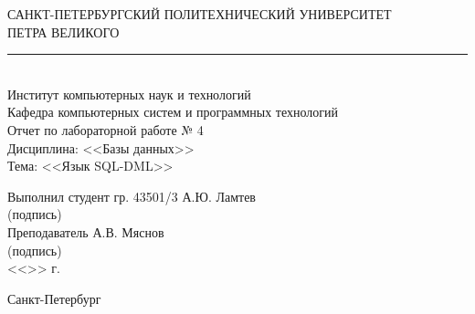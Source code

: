 \begin{titlepage}
\begin{center}
	САНКТ-ПЕТЕРБУРГСКИЙ ПОЛИТЕХНИЧЕСКИЙ УНИВЕРСИТЕТ\\ ПЕТРА ВЕЛИКОГО\\[0.3cm]
	\par\noindent\rule{10cm}{0.4pt}\\[0.3cm]
	Институт компьютерных наук и технологий \\[0.3cm]
	Кафедра компьютерных систем и программных технологий\\[4cm]
	
	Отчет по лабораторной работе № 4\\[3mm]
	Дисциплина: <<Базы данных>>\\[3mm]
	Тема: <<Язык SQL-DML>>\\[7cm]
\end{center}

\begin{flushleft}
	\hspace*{5mm} Выполнил студент гр. 43501/3  \hspace*{2.5cm}\sign[3cm]\hspace*{3.0mm} А.Ю. Ламтев\\
	\hspace*{10.4cm} (подпись)\\[3mm]
	\hspace*{5mm} Преподаватель \hspace*{6.0cm}\sign[3cm]\hspace*{2mm} А.В. Мяснов\\
	\hspace*{10.4cm} (подпись)\\[3mm]
	\hspace*{11.1cm} <<\sign[7mm]>> \sign[27mm] \the\year\hspace{1mm} г.
\end{flushleft}

\vfill

\begin{center}
	Санкт-Петербург\\
	\the\year
\end{center}
\end{titlepage}
\addtocounter{page}{1}